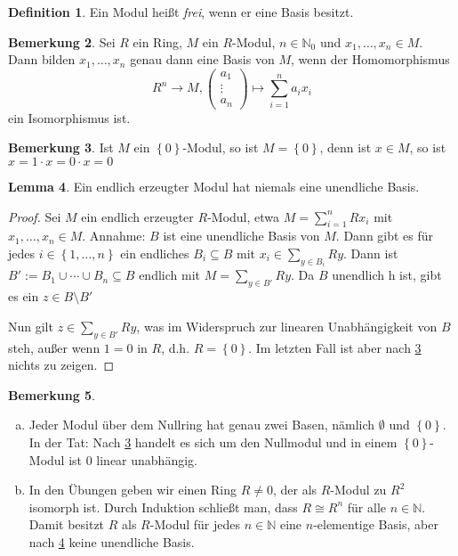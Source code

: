 \documentclass[
twoside=semi,
fontsize=12,
DIV=12, 
cleardoublepage=current,
leqno,
headings=optiontoheadandtoc, 
toc=idx
]{scrbook}
\newcommand{\N}{\mathbb{N}}
\newcommand{\set}[1]{\left\{ #1 \right\}}
\theoremstyle{definition}
\newtheorem{definition}{Definition}[section]
\newtheorem{bemerkung}[definition]{Bemerkung}
\newtheorem{lemma}[definition]{Lemma}
\begin{document}
	\begin{definition}\label{1.2.6}
		Ein Modul hei\ss t \emph{frei}, wenn er eine Basis besitzt.
	\end{definition}

	\begin{bemerkung}\label{1.2.7}
		Sei $R$ ein Ring, $M$ ein $R$-Modul, $n \in \N_0$ und $x_1, \dots, x_n \in M$. Dann bilden $x_1, \dots, x_n$ genau dann eine Basis von $M$, wenn der Homomorphismus 
		\[R^n \to M, \begin{pmatrix}
			a_1\\\vdots\\a_n
		\end{pmatrix} \mapsto \sum_{i=1}^n a_ix_i\] ein Isomorphismus ist.
	\end{bemerkung}
	
	\begin{bemerkung}\label{1.2.8}
		Ist $M$ ein $\set{0}$-Modul, so ist $M = \set{0}$, denn ist $x \in M$, so ist $x=1 \cdot x = 0 \cdot x = 0$
	\end{bemerkung}

	\begin{lemma}\label{1.2.9}
		Ein endlich erzeugter Modul hat niemals eine unendliche Basis.
		
		\begin{proof}
			Sei $M$ ein endlich erzeugter $R$-Modul, etwa $M = \sum_{i=1}^n Rx_i$ mit $x_1, \dots, x_n \in M$. \newline
			Annahme: $B$ ist eine unendliche Basis von $M$. Dann gibt es f\"ur jedes $i \in \set{1, \dots, n}$ ein endliches $B_i \subseteq B$ mit $x_i \in \sum_{y \in B_i}Ry$. Dann ist $B' := B_1 \cup \cdots \cup B_n \subseteq B$ endlich mit $M = \sum_{y \in B'}Ry$. Da $B$ unendlich h ist, gibt es ein $z \in B\setminus B'$
			
			Nun gilt $z \in \sum_{y \in B'}Ry$, was im Widerspruch zur linearen Unabh\"angigkeit von $B$ steh, au\ss er wenn $1 = 0$ in $R$, d.h. $R = \set{0}$. Im letzten Fall ist aber nach \ref{1.2.8} nichts zu zeigen.
		\end{proof}
	\end{lemma}

	\begin{bemerkung}\label{1.2.10}
		\begin{enumerate}[(a)]
			\item 
			Jeder Modul \"uber dem Nullring hat genau zwei Basen, n\"amlich $\emptyset$ und $\set{0}$. In der Tat: Nach \ref{1.2.8} handelt es sich um den Nullmodul und in einem $\set{0}$-Modul ist $0$ linear unabh\"angig.
			\item In den \"Ubungen geben wir einen Ring $R \neq 0$, der als $R$-Modul zu $R^2$ isomorph ist. Durch Induktion schlie\ss t man, dass $R \cong R^n$ f\"ur alle $n \in \N$. Damit besitzt $R$ als $R$-Modul f\"ur jedes $n \in \N$ eine $n$-elementige Basis, aber nach \ref{1.2.9} keine unendliche Basis.
		\end{enumerate}
	\end{bemerkung}
\end{document}
